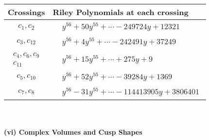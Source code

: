 \documentclass[1p]{elsarticle_modified}
\theoremstyle{definition}
\begin{document}
\begin{tabular}{m{50pt}|m{274pt}}
Crossings & \hspace{64pt}Riley Polynomials at each crossing \\
\hline $$\begin{aligned}c_{1},c_{2}\end{aligned}$$&$\begin{aligned}
&y^{56}+50 y^{55}+\cdots-249724 y+12321
\end{aligned}$\\
\hline $$\begin{aligned}c_{3},c_{12}\end{aligned}$$&$\begin{aligned}
&y^{56}+4 y^{55}+\cdots-242491 y+37249
\end{aligned}$\\
\hline $$\begin{aligned}c_{4},c_{6},c_{9}\\c_{11}\end{aligned}$$&$\begin{aligned}
&y^{56}+15 y^{55}+\cdots+275 y+9
\end{aligned}$\\
\hline $$\begin{aligned}c_{5},c_{10}\end{aligned}$$&$\begin{aligned}
&y^{56}+52 y^{55}+\cdots-39284 y+1369
\end{aligned}$\\
\hline $$\begin{aligned}c_{7},c_{8}\end{aligned}$$&$\begin{aligned}
&y^{56}-31 y^{55}+\cdots-114413905 y+3806401
\end{aligned}$\\
\hline
\end{tabular}\\~\\
\newpage\flushleft \textbf{(vi) Complex Volumes and Cusp Shapes}
\end{document}

